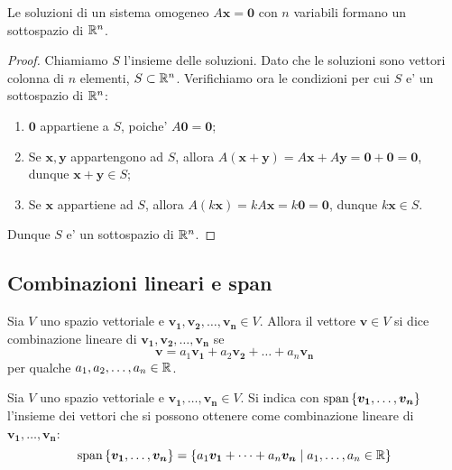 \begin{proposition}
    Le soluzioni di un sistema omogeneo $A\bm{x} = \bm{0}$ con $n$ variabili formano un sottospazio di $\mathbb{R}^n$.
\end{proposition}
\begin{proof}
    Chiamiamo $S$ l'insieme delle soluzioni. Dato che le soluzioni sono vettori colonna di $n$ elementi, $S \subset \mathbb{R}^n$. Verifichiamo ora le condizioni per cui $S$ e' un sottospazio di $\mathbb{R}^n$:
    \begin{enumerate}
        \item $\bm{0}$ appartiene a $S$, poiche' $A\bm{0} = \bm{0}$;
        \item Se $\bm{x}, \bm{y}$ appartengono ad $S$, allora $A(\bm{x} + \bm{y}) = A\bm{x} + A\bm{y} = \bm{0} + \bm{0} = \bm{0}$, dunque $\bm{x} + \bm{y} \in S$;
        \item Se $\bm{x}$ appartiene ad $S$, allora $A(k\bm{x}) = kA\bm{x} = k\bm{0} = \bm{0}$, dunque $k\bm{x} \in S$.
    \end{enumerate}
    Dunque $S$ e' un sottospazio di $\mathbb{R}^n$.
\end{proof}

\subsection{Combinazioni lineari e span}
\begin{definition}
    Sia $V$ uno spazio vettoriale e $\bm{v_1}, \bm{v_2}, \dots, \bm{v_n} \in V$. Allora il vettore $\bm{v} \in V$ si dice combinazione lineare di $\bm{v_1}, \bm{v_2}, \dots, \bm{v_n}$ se 
    \begin{equation}
        \bm{v}= a_1\bm{v_1} + a_2\bm{v_2} + \dots + a_n\bm{v_n} 
    \end{equation}
    per qualche $a_1, a_2, \dots, a_n \in \mathbb{R}$.
\end{definition}

\begin{definition}
    Sia $V$ uno spazio vettoriale e $\bm{v_1}, \dots, \bm{v_n} \in V$. Si indica con $\operatorname{span}\left\{\bm{v_1}, \dots, \bm{v_n}\right\}$ l'insieme dei vettori che si possono ottenere come combinazione lineare di $\bm{v_1}, \dots, \bm{v_n}$:
    \begin{equation}
        \operatorname{span}\left\{\bm{v_1}, \dots, \bm{v_n}\right\} = \left\{a_1\bm{v_1} + \dots + a_n\bm{v_n} \mid a_1, \dots, a_n \in \mathbb{R}\right\}
    \end{equation}
\end{definition}

